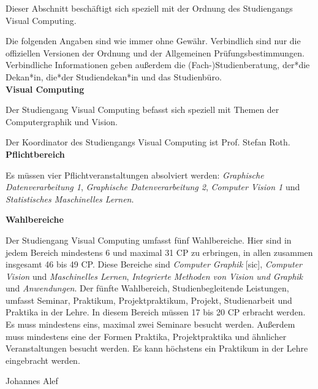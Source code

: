 {Dieser Abschnitt beschäftigt sich speziell mit der Ordnung des Studiengangs Visual Computing.
}{
Die folgenden Angaben sind wie immer ohne Gewähr. Verbindlich sind nur die offiziellen Versionen der Ordnung und der Allgemeinen Prüfungsbestimmungen. Verbindliche Informationen geben außerdem die (Fach-)Studienberatung, der*die Dekan*in, die*der Studiendekan*in und das Studienbüro.\\

\noindent\textbf{Visual Computing}

Der Studiengang Visual Computing befasst sich speziell mit Themen der Computergraphik und Vision.

Der Koordinator des Studiengangs Visual Computing ist Prof. Stefan Roth.\\

\noindent\textbf{Pflichtbereich}

Es müssen vier Pflichtveranstaltungen absolviert werden: \textit{Graphische Datenverarbeitung 1}, \textit{Graphische Datenverarbeitung 2}, \textit{Computer Vision 1} und \textit{Statistisches Maschinelles Lernen}.\\
\columnbreak

\begin{minipage}{\columnwidth} 
\noindent\textbf{Wahlbereiche}

Der Studiengang Visual Computing umfasst fünf Wahlbereiche. Hier sind in jedem Bereich mindestens 6 und maximal 31 CP zu erbringen, in allen zusammen insgesamt 46 bis 49 CP. Diese Bereiche sind \textit{Computer Graphik} [sic], \textit{Computer Vision} und \textit{Maschinelles Lernen}, \textit{Integrierte Methoden von Vision und Graphik} und \textit{Anwendungen}. Der fünfte Wahlbereich, Studienbegleitende Leistungen, umfasst Seminar, Praktikum, Projektpraktikum, Projekt, Studienarbeit und Praktika in der Lehre. In diesem Bereich müssen 17 bis 20 CP erbracht werden. Es muss mindestens eins, maximal zwei Seminare besucht werden. Außerdem muss mindestens eine der Formen Praktika, Projektpraktika und ähnlicher Veranstaltungen besucht werden. Es kann höchstens ein Praktikum in der Lehre eingebracht werden.\\
\end{minipage}
}
{Johannes Alef}